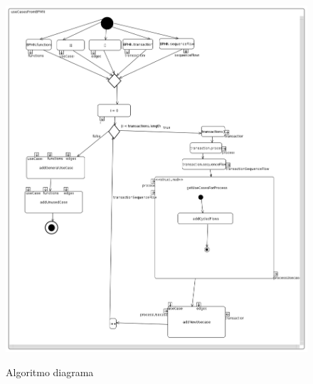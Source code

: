 \documentclass{VUMIFInfBakalaurinis}
\begin{document}
\begin{figure}[H]
	\centering
	\caption{Algoritmo diagrama}
	\includegraphics[scale=0.5]{img/algorythm-activity-diagram}
	\label{img:algorythm_activity_diagram}
\end{figure} 
\end{document}
